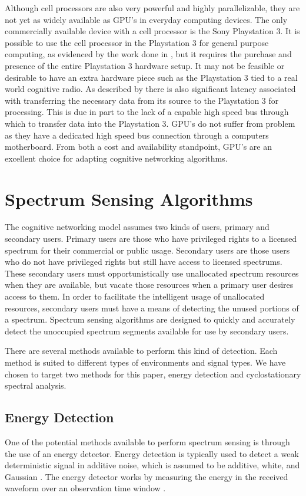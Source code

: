 Although cell processors are also very powerful and highly parallelizable, they are not yet as widely available as GPU's in everyday computing devices.  The only commercially available device with a cell processor is the Sony Playstation 3.  It is possible to use the cell processor in the Playstation 3 for general purpose computing, as evidenced by the work done in \cite{FenBos07}, but it requires the purchase and presence of the entire Playstation 3 hardware setup.  It may not be feasible or desirable to have an extra hardware piece such as the Playstation 3 tied to a real world cognitive radio.  As described by \cite{FenBos07} there is also significant latency associated with transferring the necessary data from its source to the Playstation 3 for processing.  This is due in part to the lack of a capable high speed bus through which to transfer data into the Playstation 3.  GPU's do not suffer from problem as they have a dedicated high speed bus connection through a computers motherboard.  From both a cost and availability standpoint, GPU's are an excellent choice for adapting cognitive networking algorithms.


\section{Spectrum Sensing Algorithms}
\label{sect:gpu_spect_sensing_algos}
The cognitive networking model assumes two kinds of users, primary and secondary users.  Primary users are those who have privileged rights to a licensed spectrum for their commercial or public usage.  Secondary users are those users who do not have privileged rights but still have access to licensed spectrums.  These secondary users must opportunistically use unallocated spectrum resources when they are available, but vacate those resources when a primary user desires access to them.  In order to facilitate the intelligent usage of unallocated resources, secondary users must have a means of detecting the unused portions of a spectrum.  Spectrum sensing algorithms are designed to quickly and accurately detect the unoccupied spectrum segments available for use by secondary users.

There are several methods available to perform this kind of detection.  Each method is suited to different types of environments and signal types.  We have chosen to target two methods for this paper, energy detection and cyclostationary spectral analysis.

\subsection{Energy Detection}
\label{sect:energy_detect}
One of the potential methods available to perform spectrum sensing is through the use of an energy detector.  Energy detection is typically used to detect a weak deterministic signal in additive noise, which is assumed to be additive, white, and Gaussian \cite{CabTkaBro06}.  The energy detector works by measuring the energy in the received waveform over an observation time window \cite{CabTkaBro06}.

